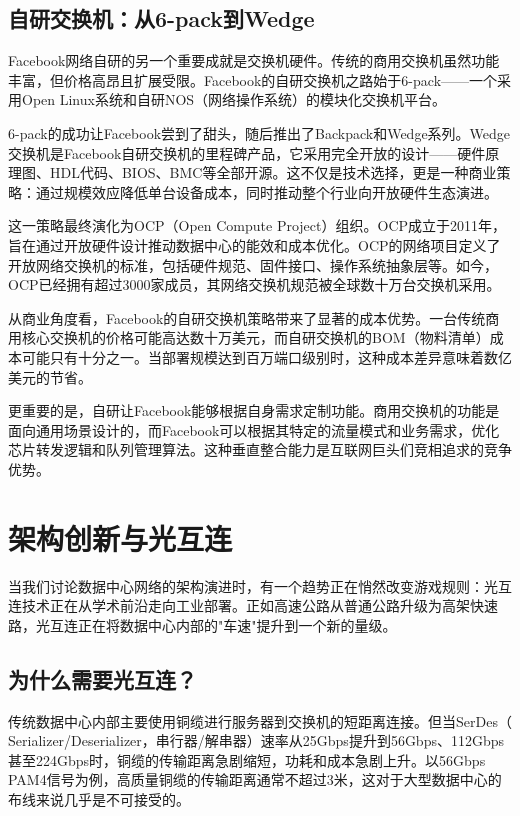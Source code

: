 \subsection{自研交换机：从6-pack到Wedge}

Facebook网络自研的另一个重要成就是交换机硬件。传统的商用交换机虽然功能丰富，但价格高昂且扩展受限。Facebook的自研交换机之路始于6-pack——一个采用Open Linux系统和自研NOS（网络操作系统）的模块化交换机平台。

6-pack的成功让Facebook尝到了甜头，随后推出了Backpack和Wedge系列。Wedge交换机是Facebook自研交换机的里程碑产品，它采用完全开放的设计——硬件原理图、HDL代码、BIOS、BMC等全部开源。这不仅是技术选择，更是一种商业策略：通过规模效应降低单台设备成本，同时推动整个行业向开放硬件生态演进。

这一策略最终演化为OCP（Open Compute Project）组织。OCP成立于2011年，旨在通过开放硬件设计推动数据中心的能效和成本优化。OCP的网络项目定义了开放网络交换机的标准，包括硬件规范、固件接口、操作系统抽象层等。如今，OCP已经拥有超过3000家成员，其网络交换机规范被全球数十万台交换机采用。

从商业角度看，Facebook的自研交换机策略带来了显著的成本优势。一台传统商用核心交换机的价格可能高达数十万美元，而自研交换机的BOM（物料清单）成本可能只有十分之一。当部署规模达到百万端口级别时，这种成本差异意味着数亿美元的节省。

更重要的是，自研让Facebook能够根据自身需求定制功能。商用交换机的功能是面向通用场景设计的，而Facebook可以根据其特定的流量模式和业务需求，优化芯片转发逻辑和队列管理算法。这种垂直整合能力是互联网巨头们竞相追求的竞争优势。

\section{架构创新与光互连}

当我们讨论数据中心网络的架构演进时，有一个趋势正在悄然改变游戏规则：光互连技术正在从学术前沿走向工业部署。正如高速公路从普通公路升级为高架快速路，光互连正在将数据中心内部的"车速"提升到一个新的量级。

\subsection{为什么需要光互连？}

传统数据中心内部主要使用铜缆进行服务器到交换机的短距离连接。但当SerDes（ Serializer/Deserializer，串行器/解串器）速率从25Gbps提升到56Gbps、112Gbps甚至224Gbps时，铜缆的传输距离急剧缩短，功耗和成本急剧上升。以56Gbps PAM4信号为例，高质量铜缆的传输距离通常不超过3米，这对于大型数据中心的布线来说几乎是不可接受的。

